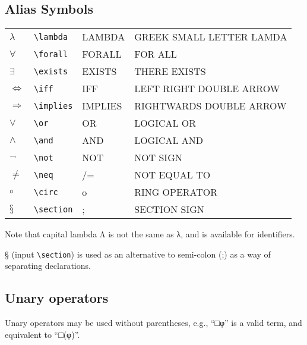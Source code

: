 \subsection{Alias Symbols}

\begin{center}
\smaller
{} \label{unicode:aliases}
\begin{xtabular}{|ll>{\ttfamily}l>{\smaller\ttfamily}l|}\hline
  $λ$ & \verb|\lambda| & LAMBDA & GREEK SMALL LETTER LAMDA \\
  $∀$ & \verb|\forall| & FORALL & FOR ALL \\
  $∃$ & \verb|\exists| & EXISTS & THERE EXISTS \\
  $⇔$ & \verb|\iff| & IFF & LEFT RIGHT DOUBLE ARROW \\
  $⇒$ & \verb|\implies| & IMPLIES & RIGHTWARDS DOUBLE ARROW \\
  $∨$ & \verb|\or| & OR & LOGICAL OR \\
  $∧$ & \verb|\and| & AND & LOGICAL AND \\
  $¬$ & \verb|\not| & NOT & NOT SIGN \\
  $≠$ & \verb|\neq| & /= & NOT EQUAL TO \\
  $∘$ & \verb|\circ| & o & RING OPERATOR \\
  $§$ & \verb|\section| & ; & SECTION SIGN \\ \hline
\end{xtabular}
\end{center}
  
Note that capital lambda Λ is not the same as λ, and is available for
identifiers.

§ (input \verb|\section|) is used as an alternative to semi-colon (;) as a
way of separating declarations.

\subsection{Unary operators}

Unary operators may be used without parentheses, e.g., ``□φ'' is a valid
term, and equivalent to ``□(φ)''.


